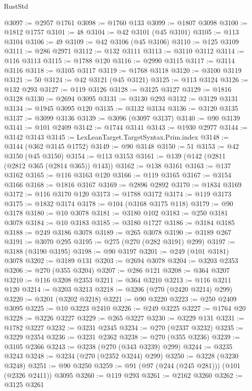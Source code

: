 \begin{lexlean}{RustStd}
\begin{coremodule}
@3097 := @2957 @1761
@3098 := @1760 @133
@3099 := @1807 @3098
@3100 := @1812 @1757
@3101 := 48
@3104 := @42 @3101 (@45 @3101)
@3105 := @113 @3104
@3106 := 49
@3109 := @42 @3106 (@45 @3106)
@3110 := @125 @3109
@3111 := @286 @2971
@3112 := @132 @3111
@3113 := @3110 @3112
@3114 := @116 @3113
@3115 := @1788 @120
@3116 := @2990 @3115
@3117 := @3114 @3116
@3118 := @3105 @3117
@3119 := @1768 @3118
@3120 := @3100 @3119
@3121 := 50
@3124 := @42 @3121 (@45 @3121)
@3125 := @113 @3124
@3126 := @132 @293
@3127 := @119 @3126
@3128 := @3125 @3127
@3129 := @1816 @3128
@3130 := @2694 @3095
@3131 := @3130 @293
@3132 := @3129 @3131
@3134 := @1945 @3095 @120
@3135 := @3132 @3134
@3136 := @3120 @3135
@3137 := @3099 @3136
@3139 := @3096 (@3097 @3137)
@3140 := @90 @3139
@3141 := @101 @2409
@3142 := @1744 @3141
@3143 := @1930 @2977
@3144 := @3142 @3143
@3145 := LexLeanTarget.TargetSyntax.Prim.index
@3148 := @3144 (@362 @3145 @1752)
@3149 := @90 @3148
@3150 := 51
@3153 := @42 @3150 (@45 @3150)
@3154 := @113 @3153
@3161 := @139 (@142 (@2811 (@2812 @365 (@2814 @365)) @143))
@3162 := @138 @3161
@3163 := @137 @3162
@3165 := @116 @3163 @120
@3166 := @119 @3165
@3167 := @3154 @3166
@3168 := @1816 @3167
@3169 := @2896 @2892
@3170 := @1834 @3169
@3172 := @116 @3170 @120
@3173 := @1788 @3172
@3174 := @119 @3173
@3175 := @1832 @3174
@3178 := @104 (@3168 @3175 @118)
@3179 := @90 @3178
@3180 := @10 @3078
@3181 := @3180 @102
@3183 := @250 @3181 @3078
@3184 := @10 @3183
@3185 := @3180 @1727
@3186 := @3184 @3185
@3188 := @249 @3186 @3078
@3189 := @265 @3078
@3190 := @3189 @267
@3191 := @3070 @295
@3195 := @275 (@270 (@282 @3191) @299)
@3197 := @3188 (@3190 @3195)
@3198 := @90 @3197
@3201 := @249 (@101 @3181) @3078
@3202 := @3189 @131
@3203 := @2694 @3078
@3204 := @3203 @2353
@3206 := @270 (@355 @3204)
@3207 := @286 @121
@3208 := @364 @3207
@3210 := @116 @3208 @2353
@3211 := @364 @3210
@3213 := @116 @3211 @120
@3214 := @3203 @3213
@3218 := @3206 (@270 (@2420 @3214) @299)
@3220 := @3201 (@3202 @3218)
@3221 := @90 @3220
@3223 := @250 @2409 @3095
@3225 := @10 @3223 @2410
@3226 := @249 @3225
@3227 := @1764 @20
@3228 := @3226 @3227
@3229 := @265 @3227
@3230 := @3229 @131
@3231 := @1782 @3227
@3232 := @3231 @2345
@3234 := @270 (@2337 @3232)
@3235 := @3229 @2354
@3236 := @3231 @2362
@3238 := @270 (@355 @3236)
@3239 := @3105 @2366
@3243 := @3238 (@270 (@343 @3239) @299)
@3244 := @3235 @3243
@3248 := @3234 (@270 (@2352 @3244) @299)
@3250 := @3228 (@3230 @3248)
@3251 := @90 @3250
@3259 := @91 (@97 (@244 (@245 @281))) (@101 (@2326 @2411)) @3095
@3260 := @119 @293
@3261 := @2162 @3260
@3262 := @3125 @3261

\end{coremodule}
\end{lexlean}
